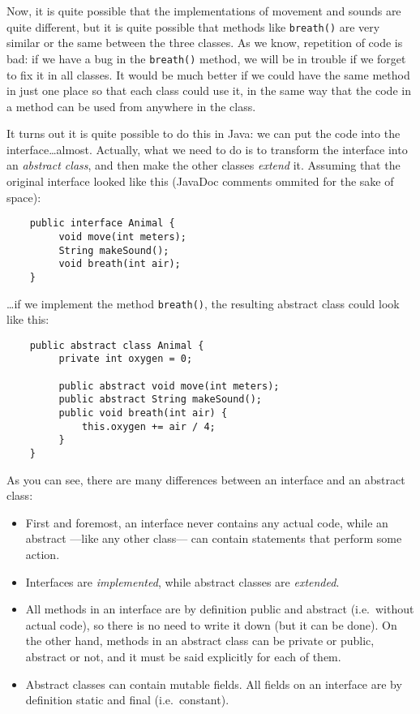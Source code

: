 {Now, it is quite possible that the implementations of movement and
sounds are quite different, but it is quite possible that methods like
\verb+breath()+ are very similar or the same between the three
classes. As we know, repetition of code is bad: if we have a bug
in the \verb+breath()+ method, we will be in trouble if we forget to
fix it in all classes. It would be much better if we could have the
same method in just one place so that each class could use it, in the
same way that the code in a method can be used from anywhere in the
class. 

It turns out it is quite possible to do this in Java: we can put the
code into the interface\ldots almost. Actually, what we need to do is
to transform the interface into an \emph{abstract class}, and then
make the other classes \emph{extend} it. Assuming
that the original interface looked like this (JavaDoc comments ommited
for the sake of space):

\begin{verbatim}
    public interface Animal {
         void move(int meters);
         String makeSound();
         void breath(int air);
    }
\end{verbatim}

\ldots if we implement the method \verb+breath()+, the resulting
abstract class could look like this: 

\begin{verbatim}
    public abstract class Animal {
         private int oxygen = 0;

         public abstract void move(int meters);
         public abstract String makeSound();
         public void breath(int air) {
             this.oxygen += air / 4;
         }
    }        
\end{verbatim}

As you can see, there are many differences between an interface and an
abstract class: 

\begin{itemize}
\item First and foremost, an interface never contains any actual code,
  while an abstract ---like any other class--- can contain statements
  that perform some action.
\item Interfaces are \emph{implemented}, while abstract classes are
  \emph{extended}.
\item All methods in an interface are by definition public and
  abstract (i.e.~without actual code), so there is no need to write it
  down (but it can be done). On the other hand, methods in an abstract
  class can be private or public, abstract or not, and it must be said
  explicitly for each of them.
\item Abstract classes can contain mutable fields. All fields on an
  interface are by definition static and final (i.e.~constant).
\end{itemize}

}
